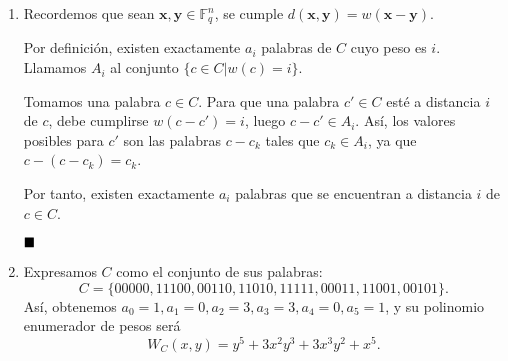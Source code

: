 \begin{enumerate}[label=\alph*)]
	\item Recordemos que sean $\textbf{x}, \textbf{y} \in \mathbb{F}_q^n$, se cumple $d(\textbf{x}, \textbf{y}) = w(\textbf{x}-\textbf{y})$.
	
	
	
	
	Por definición, existen exactamente $a_i$ palabras de $C$ cuyo peso es $i$. Llamamos $A_i$ al conjunto $\{c\in C | w(c) = i\}$.
	
	Tomamos una palabra $c \in C$. Para que una palabra $c' \in C$ esté a distancia $i$ de $c$, debe cumplirse $w(c - c') = i$, luego $c - c' \in A_i$. Así, los valores posibles para $c'$ son las palabras $c - c_k$ tales que $c_k \in A_i$, ya que $c - (c - c_k) = c_k$.
	
	Por tanto, existen exactamente $a_i$ palabras que se encuentran a distancia $i$ de $c \in C$.
	
	$\qed$
	
	
	\item Expresamos $C$ como el conjunto de sus palabras:
	\[C = \{00000, 11100, 00110, 11010, 11111, 00011, 11001, 00101\}.\]
	Así, obtenemos $a_0 = 1, a_1 = 0, a_2 = 3, a_3 = 3, a_4 = 0, a_5 = 1$, y su polinomio enumerador de pesos será
	\[W_C(x, y) = y^5 + 3x^2y^3 + 3x^3y^2 + x^5.\]
	

\end{enumerate}
